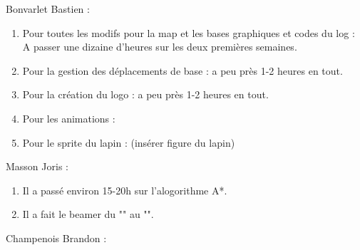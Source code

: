 \documentclass[a4paper, 11pt]{article}
\begin{document}
Bonvarlet Bastien :\\
\begin{enumerate}
\item Pour toutes les modifs pour la map et les bases graphiques et codes du log : A passer une dizaine d'heures sur les deux premières semaines.\\
\item Pour la gestion des déplacements de base : a peu près 1-2 heures en tout.\\
\item Pour la création du logo : a peu près 1-2 heures en tout.\\
\item Pour les animations : \\
\item Pour le sprite du lapin : (insérer figure du lapin)\\
\end{enumerate}
\newpage
Masson Joris : \\
\begin{enumerate}
\item Il a passé environ 15-20h sur l'alogorithme  A*.
\item Il a fait le beamer du "" au "".
\end{enumerate}
\newpage
Champenois Brandon : \\
\end{document}
